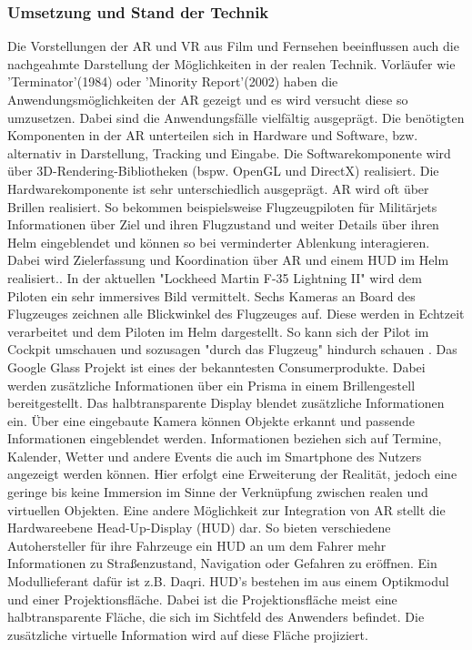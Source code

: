 \documentclass[12pt,a4paper,bibliography=totocnumbered,listof=totocnumbered]{scrartcl}
\begin{document}
\subsubsection{Umsetzung und Stand der Technik}
Die Vorstellungen der AR und VR aus Film und Fernsehen beeinflussen auch die nachgeahmte Darstellung der Möglichkeiten in der realen Technik. Vorläufer wie 'Terminator'(1984) oder 'Minority Report'(2002) haben die Anwendungsmöglichkeiten der AR gezeigt und es wird versucht diese so umzusetzen. Dabei sind die Anwendungsfälle vielfältig ausgeprägt.\newline
Die benötigten Komponenten in der AR unterteilen sich in Hardware und Software, bzw. alternativ in Darstellung, Tracking und Eingabe. Die Softwarekomponente wird über 3D-Rendering-Bibliotheken (bspw. OpenGL und DirectX) realisiert. Die Hardwarekomponente ist sehr unterschiedlich ausgeprägt.%
AR wird oft über Brillen realisiert. So bekommen beispielsweise Flugzeugpiloten für Militärjets Informationen über Ziel und ihren Flugzustand und weiter Details über ihren Helm eingeblendet und können so bei verminderter Ablenkung interagieren. Dabei wird Zielerfassung und Koordination über AR und einem HUD im Helm realisiert.\cite{Jenkins:2007aa}. In der aktuellen "Lockheed Martin F-35 Lightning II" wird dem Piloten ein sehr immersives Bild vermittelt. Sechs Kameras an Board des Flugzeuges zeichnen alle Blickwinkel des Flugzeuges auf. Diese werden in Echtzeit verarbeitet und dem Piloten im Helm dargestellt. So kann sich der Pilot im Cockpit umschauen und sozusagen "durch das Flugzeug" hindurch schauen \cite{MOYNIHAN:aa}.
Das Google Glass Projekt ist eines der bekanntesten Consumerprodukte. Dabei werden zusätzliche Informationen über ein Prisma in einem Brillengestell bereitgestellt. Das halbtransparente Display blendet zusätzliche Informationen ein. Über eine eingebaute Kamera können Objekte erkannt und passende Informationen eingeblendet werden. Informationen beziehen sich auf Termine, Kalender, Wetter und andere Events die auch im Smartphone des Nutzers angezeigt werden können. Hier erfolgt eine Erweiterung der Realität, jedoch eine geringe bis keine Immersion im Sinne der Verknüpfung zwischen realen und virtuellen Objekten. 
Eine andere Möglichkeit zur Integration von AR stellt die Hardwareebene Head-Up-Display (\ac{HUD}) dar. So bieten verschiedene Autohersteller für ihre Fahrzeuge ein HUD an um dem Fahrer mehr Informationen zu Straßenzustand, Navigation oder Gefahren zu eröffnen. Ein Modullieferant dafür ist z.B. Daqri. HUD's bestehen im aus einem Optikmodul und einer Projektionsfläche. Dabei ist die Projektionsfläche meist eine halbtransparente Fläche, die sich im Sichtfeld des Anwenders befindet. Die zusätzliche virtuelle Information wird auf diese Fläche projiziert. 
\end{document}
